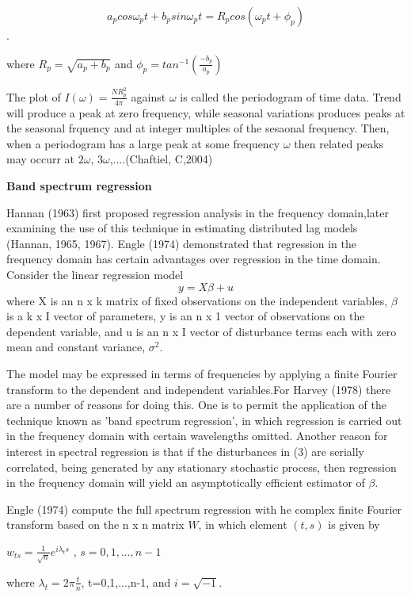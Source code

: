 \documentclass{article}\usepackage[]{graphicx}\usepackage[]{color}
\begin{document}
$$a_p cos \omega_p t + b_p sin \omega_pt=R_p cos (\omega_p t + \phi_p)$$.

where  $R_p=\sqrt{a_p+b_p}$ and $\phi_p=tan^{-1}(\frac{-b_p}{a_p})$

The plot of $I(\omega) = \frac{N R^2_p}{4\pi}$ against $\omega$ is called the periodogram of time data. Trend will produce a peak at zero frequency, while seasonal variations produces peaks at the seasonal frquency and at integer multiples of the sesaonal frequency. Then, when a periodogram has a large peak at some frequency $\omega$ then related peaks may occurr at $2\omega$, $3\omega$,....(Chaftiel, C,2004)

{\bf Band spectrum regression}


Hannan (1963) first proposed regression analysis in the frequency domain,later examining the use of this technique in estimating distributed lag models (Hannan, 1965, 1967). Engle (1974) demonstrated that regression in the frequency domain has certain advantages over regression in the time domain.
Consider the linear regression model
\begin{equation}
    y=X\beta+u
    \end{equation}
where X is an n x k matrix of fixed observations on the independent variables, $ \beta $ is a k x I vector of parameters, y is an n x 1 vector of observations on the dependent variable, and u is an n x I vector of disturbance terms each with zero mean and constant variance, $\sigma^2$. 

The model may be expressed in terms of frequencies by applying a finite Fourier transform to the dependent and independent variables.For Harvey (1978) there are a number of reasons for doing this. One is to permit the application of the technique known as 'band spectrum regression', in which regression is carried out in the frequency domain with certain wavelengths omitted. Another reason for interest in spectral regression is that if the disturbances in (3) are serially correlated, being generated by any stationary stochastic process, then regression in the frequency domain will yield an asymptotically efficient estimator of $ \beta $.


Engle (1974) compute the full spectrum regression with he complex finite Fourier transform based on the {n x n} matrix $W$, in which element $(t, s)$ is given by

   $ w_{ts}=\frac{1}{\sqrt n} e^{i\lambda_t s}$ , $s= 0,1,...,n-1$
    
where $\lambda_t = 2\pi \frac {t}n$, t=0,1,...,n-1, and $i=\sqrt{-1}$.
\end{document}
